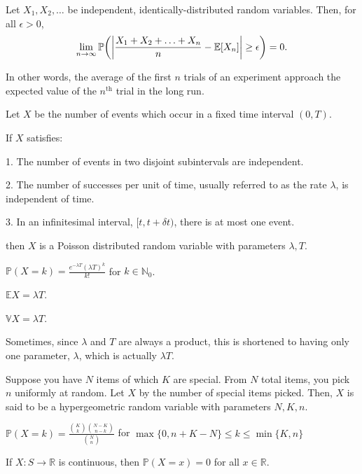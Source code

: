 \documentclass{article}
\begin{document}
\medskip
{}

    Let $X_1, X_2, \hdots$ be independent, identically-distributed random variables. Then, for all $\epsilon > 0$,
    $$\lim_{n\to\infty}\mathbb P\bigg{(}\bigg{|}\frac{X_1+X_2 + \hdots + X_n}{n} - \mathbb E[X_n] \bigg{|} \geq \epsilon\bigg{)} = 0.$$
    
    In other words, the average of the first $n$ trials of an experiment approach the expected value of the $n^\text{th}$ trial in the long run.
    
\medskip
{}

    Let $X$ be the number of events which occur in a fixed time interval $(0, T)$.
    
    If $X$ satisfies:
    
    1. The number of events in two disjoint subintervals are independent.
    
    2. The number of successes per unit of time, usually referred to as the rate $\lambda$, is independent of time.
    
    3. In an infinitesimal interval, $[t, t+\delta t)$, there is at most one event.
    
    then $X$ is a Poisson distributed random variable with parameters $\lambda, T$.
    
    $\mathbb P(X=k) = \frac{e^{-\lambda T}(\lambda T)^k}{k!}$ for $k \in \mathbb N_0$.
    
    $\mathbb EX = \lambda T$.
    
    $\mathbb VX = \lambda T$.
    
    Sometimes, since $\lambda$ and $T$ are always a product, this is shortened to having only one parameter, $\lambda$, which is actually $\lambda T$.
    
\medskip
{}

    Suppose you have $N$ items of which $K$ are special. From $N$ total items, you pick $n$ uniformly at random. Let $X$ by the number of special items picked. Then, $X$ is said to be a hypergeometric random variable with parameters $N,K,n$.
    
    $\mathbb P(X=k) = \frac{{K \choose k}{{N-K}\choose{n-k}}}{{N \choose n}}$ for $\max\{0, n + K - N\} \leq k \leq \min\{K,n\}$
    
\medskip
{}

    If $X: S \to \mathbb R$ is continuous, then $\mathbb P(X = x) = 0$ for all $x \in \mathbb R$.
    
\end{document}
